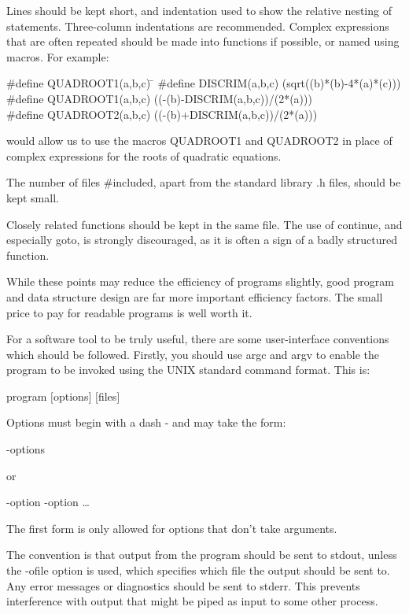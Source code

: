      Lines should  be kept  short, and  indentation used  to show the
relative nesting of  statements.  Three-column indentations are
recommended.
Complex  expressions that are often repeated should  be made 
into functions if possible, or named using macros.  For example:
\begin{code}
\#define QUADROOT1(a,b,c) \= \kill
\#define DISCRIM(a,b,c) \>   (sqrt((b)*(b)-4*(a)*(c))) \\
\#define QUADROOT1(a,b,c) \> ((-(b)-DISCRIM(a,b,c))/(2*(a))) \\
\#define QUADROOT2(a,b,c) \> ((-(b)+DISCRIM(a,b,c))/(2*(a)))
\end{code}
\noindent
     would allow  us to  use the  macros {\cd QUADROOT1}  and {\cd
QUADROOT2}  in place of complex expressions for the roots of
quadratic equations.

     The number of files {\cd \#include}d, apart from the standard
library .h files,  should be kept small.

     Closely related  functions should  be kept  in the  same file.
The use of {\cd continue}, and  especially {\cd goto}, is strongly
discouraged, as it is often a sign of a badly structured function.

     While these  points may  reduce the efficiency of programs
slightly, good program and  data structure  design are far more
important efficiency factors.  The small price to pay for readable
programs is well worth it.

     For a  software tool  to be  truly useful,  there are some
user-interface conventions which should be followed. 
Firstly, you
should use {\cd argc} and {\cd argv} to enable the  program to be
invoked using the UNIX standard command format. This is:
\begin{display}\ms
 program  $[$options$]$  $[$files$]$
\end{display}
\noindent
     Options must begin with a dash {\cd -} and may take the form:
\begin{display}\ms
{\cd -}options
\end{display}
\noindent
or   
\begin{display}\ms
{\cd -}option\/ {\cd -}option \ldots
\end{display}
\noindent
 The first form is only allowed for options that don't take arguments.

     The convention  is that output from the program should be sent
to {\fn stdout}, unless the {\cmd -o}{\ms file\/}  option is  used,
which  specifies which file the output should be  sent to. Any error
messages or diagnostics should be sent to {\fn stderr}.  This
prevents interference with output that might be piped as input to some
other process.


